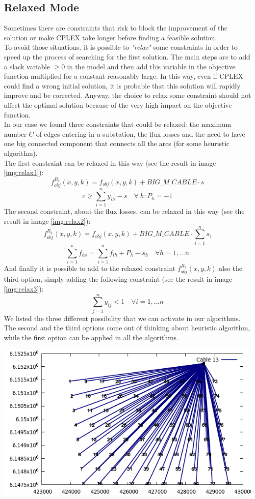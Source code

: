 \subsection{Relaxed Mode}
Sometimes there are constraints that risk to block the improvement of the solution or make \textsc{CPLEX} take longer before finding a feasible solution. \\
To avoid those situations, it is possible to \textit{"relax"} some constraints in order to speed up the process of searching for the first solution. The main steps are to add a slack variable $\geq 0$ in the model and then add this variable in the objective function multiplied for a constant reasonably large. In this way, even if \textsc{CPLEX} could find a wrong initial solution, it is probable that this solution will rapidly improve and be corrected. Anyway, the choice to relax some constraint should not affect the optimal solution because of the very high impact on the objective function. \\
In our case we found three constraints that could be relaxed: the maximum number $C$ of edges entering in a substation, the flux losses and the need to have one big connected component that connects all the arcs (for some heuristic algorithm). \\
The first constraint can be relaxed in this way (see the result in image \ref{img:relax1}):
\[
f^{R_1}_{obj} (x,y,k) = f_{obj} (x,y,k) + BIG\_M\_CABLE \cdot s
\]
\[
c \geq \sum^n_{i=1} y_{ih} -s \quad \forall \ h : P_h = -1
\]
The second constraint, about the flux losses, can be relaxed in this way (see the result in image \ref{img:relax2}):
\[
f^{R_2}_{obj} (x,y,k) = f_{obj} (x,y,k) + BIG\_M\_CABLE \cdot \sum^n_{i=1} s_i
\]
\[
\sum^n_{i=1} f_{hs} = \sum^n_{i=1} f_{ih} + P_h - s_h \quad \forall h = 1, ... n
\]
And finally it is possible to add to the relaxed constraint $f^{R_2}_{obj} (x,y,k)$ also the third option, simply adding the following constraint (see the result in image \ref{img:relax3}): 
\[
\sum^n_{j=1} y_{ij} < 1 \quad \forall i = 1, ... n
\]
We listed the three different possibility that we can activate in our algorithms. The second and the third options come out of thinking about heuristic algorithm, while the first option can be applied in all the algorithms. 
\begin{center}
	\includegraphics[scale=0.4]{Graphics/data02-relax1.png}
	\label{img:relax1}
\end{center}

